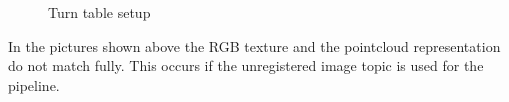 \documentclass[main.tex]{subfiles}
\begin{document}
		\begin{figure}[H]
   			 \centering
   			 \caption{Turn table setup}
			  \label{turnTableOriginal}
  		\end{figure}
In the pictures shown above the RGB texture and the pointcloud representation do not match fully. This occurs if the unregistered image topic is used for the pipeline. 
\end{document}
